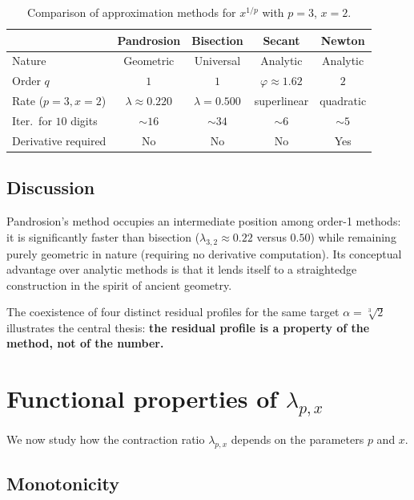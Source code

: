 \documentclass[10pt,a4paper,oneside]{book}
\theoremstyle{definition}
\theoremstyle{remark}
\newcommand{\cbrt}[1]{\sqrt[3]{#1}}
\begin{document}
\begin{table}[h]
\centering
\renewcommand{\arraystretch}{1.4}
\begin{tabular}{lcccc}
\toprule
& \textbf{Pandrosion} & \textbf{Bisection} & \textbf{Secant} & \textbf{Newton} \\
\midrule
Nature & Geometric & Universal & Analytic & Analytic \\
Order $q$ & $1$ & $1$ & $\varphi \approx 1.62$ & $2$ \\
Rate ($p\!=\!3, x\!=\!2$) & $\lambda \approx 0.220$ & $\lambda = 0.500$ & superlinear & quadratic \\
Iter.\ for $10$ digits & $\sim 16$ & $\sim 34$ & $\sim 6$ & $\sim 5$ \\
Derivative required & No & No & No & Yes \\
\bottomrule
\end{tabular}
\caption{Comparison of approximation methods for $x^{1/p}$ with $p=3$, $x=2$.}
\end{table}

\subsection{Discussion}

Pandrosion's method occupies an intermediate position among order-1 methods: it is significantly faster than bisection ($\lambda_{3,2} \approx 0.22$ versus $0.50$) while remaining purely geometric in nature (requiring no derivative computation).  Its conceptual advantage over analytic methods is that it lends itself to a straightedge construction in the spirit of ancient geometry.

The coexistence of four distinct residual profiles for the same target $\alpha = \cbrt{2}$ illustrates the central thesis: \textbf{the residual profile is a property of the method, not of the number.}

\section{Functional properties of \texorpdfstring{$\lambda_{p,x}$}{lambda}}
\label{sec:functional}

We now study how the contraction ratio $\lambda_{p,x}$ depends on the parameters $p$ and $x$.

\subsection{Monotonicity}
\end{document}
